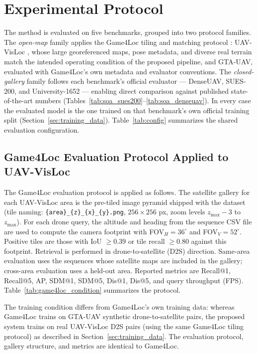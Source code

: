 \documentclass[conference]{IEEEtran}
\begin{document}
\section{Experimental Protocol}
The method is evaluated on five benchmarks, grouped into two protocol
families. The \emph{open-map} family applies the Game4Loc tiling and
matching protocol \cite{ji2024game4loc}: UAV-VisLoc
\cite{xu2024uavvisloc}, whose large georeferenced maps, pose metadata, and
diverse real terrain match the intended operating condition of the proposed
pipeline, and GTA-UAV, evaluated with Game4Loc's own metadata and evaluator
conventions. The \emph{closed-gallery} family follows each benchmark's
official evaluator — DenseUAV, SUES-200, and University-1652 — enabling
direct comparison against published state-of-the-art numbers
(Tables~\ref{tab:soa_sues200}--\ref{tab:soa_denseuav}). In every case the
evaluated model is the one trained on that benchmark's own official
training split (Section~\ref{sec:training_data}).
Table~\ref{tab:config} summarizes the shared evaluation configuration.

\subsection{Game4Loc Evaluation Protocol Applied to UAV-VisLoc}
The Game4Loc evaluation protocol is applied as follows.
The satellite gallery for each UAV-VisLoc area is the pre-tiled image pyramid
shipped with the dataset (tile naming: \texttt{\{area\}\_\{z\}\_\{x\}\_\{y\}.png},
$256\times256$ px, zoom levels $z_{\max}-3$ to $z_{\max}$).
For each drone query, the altitude and heading from the sequence CSV file are
used to compute the camera footprint with FOV$_H=36^\circ$ and FOV$_V=52^\circ$.
Positive tiles are those with IoU $\geq 0.39$ or tile recall $\geq 0.80$
against this footprint.
Retrieval is performed in drone-to-satellite (D2S) direction.
Same-area evaluation uses the sequences whose satellite maps are included in
the gallery; cross-area evaluation uses a held-out area.
Reported metrics are Recall@1, Recall@5, AP, SDM@1, SDM@5, Dis@1, Dis@5,
and query throughput (FPS). Table~\ref{tab:game4loc_condition} summarizes the
protocol.

The training condition differs from Game4Loc's own training data: whereas
Game4Loc trains on GTA-UAV synthetic drone-to-satellite pairs, the proposed
system trains on real UAV-VisLoc D2S pairs (using the same Game4Loc tiling
protocol) as described in Section~\ref{sec:training_data}. The evaluation
protocol, gallery structure, and metrics are identical to Game4Loc.
\end{document}
